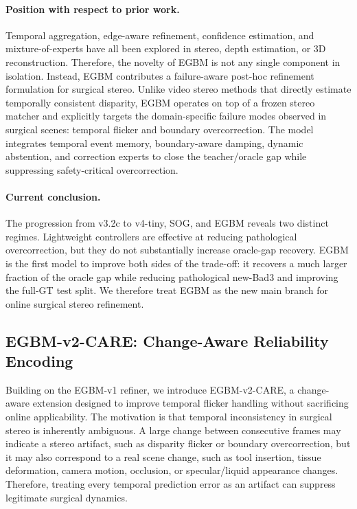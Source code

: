 \documentclass[11pt,a4paper]{article}
\begin{document}
\paragraph{Position with respect to prior work.}
Temporal aggregation, edge-aware refinement, confidence estimation, and
mixture-of-experts have all been explored in stereo, depth estimation, or 3D
reconstruction. Therefore, the novelty of EGBM is not any single component in
isolation. Instead, EGBM contributes a failure-aware post-hoc refinement
formulation for surgical stereo. Unlike video stereo methods that directly
estimate temporally consistent disparity, EGBM operates on top of a frozen stereo
matcher and explicitly targets the domain-specific failure modes observed in
surgical scenes: temporal flicker and boundary overcorrection. The model
integrates temporal event memory, boundary-aware damping, dynamic abstention, and
correction experts to close the teacher/oracle gap while suppressing
safety-critical overcorrection.

\paragraph{Current conclusion.}
The progression from v3.2c to v4-tiny, SOG, and EGBM reveals two distinct
regimes. Lightweight controllers are effective at reducing pathological
overcorrection, but they do not substantially increase oracle-gap recovery. EGBM
is the first model to improve both sides of the trade-off: it recovers a much
larger fraction of the oracle gap while reducing pathological new-Bad3 and
improving the full-GT test split. We therefore treat EGBM as the new main branch
for online surgical stereo refinement.


\subsection{EGBM-v2-CARE: Change-Aware Reliability Encoding}

Building on the EGBM-v1 refiner, we introduce EGBM-v2-CARE, a
change-aware extension designed to improve temporal flicker handling without
sacrificing online applicability. The motivation is that temporal inconsistency
in surgical stereo is inherently ambiguous. A large change between consecutive
frames may indicate a stereo artifact, such as disparity flicker or boundary
overcorrection, but it may also correspond to a real scene change, such as tool
insertion, tissue deformation, camera motion, occlusion, or specular/liquid
appearance changes. Therefore, treating every temporal prediction error as an
artifact can suppress legitimate surgical dynamics.
\end{document}
